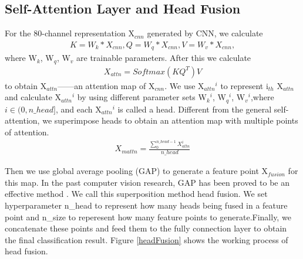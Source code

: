\documentclass[10pt, conference, compsocconf]{IEEEtran}
\begin{document}
\subsection{Self-Attention Layer and Head Fusion}
For the 80-channel representation X$_{cnn}$ generated by CNN, we calculate
\begin{equation}
\begin{split}
\displaystyle
K=W_k*X_{cnn},
Q=W_q*X_{cnn},
V=W_v*X_{cnn},
\end{split}
\end{equation}
where W$_k$, W$_q$, W$_v$ are trainable parameters.
After this we calculate
\begin{equation}
\begin{split}
\displaystyle
X_{attn}=Softmax(KQ^T)V
\end{split}
\end{equation}
to obtain X$_{attn}$——an attention map of X$_{cnn}$. We use X$_{attn}$$^i$ to represent i$_{th}$ X$_{attn}$ and calculate X$_{attn}$$^i$ by using different parameter sets W$_k$$^i$, W$_q$$^i$, W$_v$$^i$,where $i \in (0,n\_head]$, and each X$_{attn}$$^i$ is called a head. Different from the general self-attention, we superimpose heads to obtain an attention map with multiple points of attention.
\begin{equation}
\begin{split}
\displaystyle
X_{mattn}=\frac{\sum_{0}^{n\_head-1}X_{attn}^i}{n\_head}
\end{split}
\end{equation}

Then we use global average pooling (GAP) to generate a feature point X$_{fusion}$ for this map. In the past computer vision research, GAP has been proved to be an effective method \cite{he2016deep}. We call this superposition method head fusion. We set hyperparameter n\_head to represent how many heads being fused in a feature point and n\_size to reperesent how many feature points to generate.Finally, we concatenate these points and feed them to the fully connection layer to obtain the final classification result.
Figure \ref{headFusion} shows the working process of head fusion.
\end{document}
